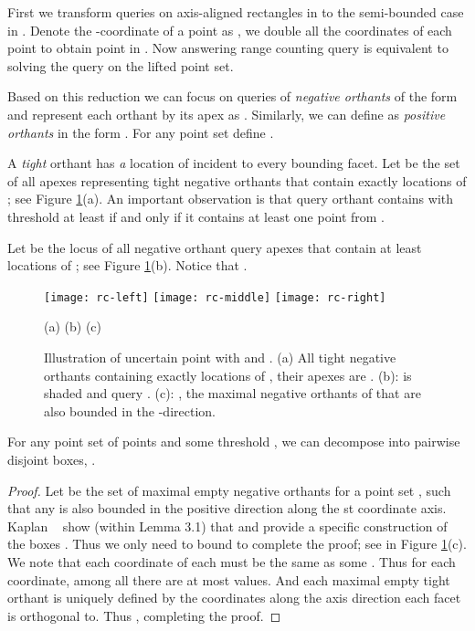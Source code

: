 \documentclass[11pt]{myclass}
\begin{document}
First we transform queries on axis-aligned rectangles in  to the semi-bounded case in .  Denote the -coordinate of a point  as , we double all the coordinates of each point  to obtain point  in . 
Now answering range counting query  is equivalent to solving the query  
on the lifted point set.

Based on this reduction we can focus on queries of \emph{negative orthants} of the form  and represent each orthant by its apex  as .  Similarly, we can define  as \emph{positive orthants} in the form . For any point set  define .

A \emph{tight} orthant has \emph{a} location of  incident to every bounding facet.    
Let  be the set of all apexes representing tight negative orthants that contain exactly  locations of ; see Figure \ref{fig:rc123}(a).   An important observation is that query orthant  contains  with threshold at least  if and only if it contains at least one point from .
 
Let  be the locus of all negative orthant query apexes that contain at least  locations of ; see Figure \ref{fig:rc123}(b).  
Notice that .
 
\begin{figure}[t]
\centering
\texttt{[image: rc-left]}
\hspace{2mm}
\texttt{[image: rc-middle]}
\hspace{2mm}
\texttt{[image: rc-right]}

\vspace{-1mm}
(a)  \hspace{1.85in} (b) \hspace{1.85in} (c)

\vspace{-3mm}
\caption{\small Illustration of uncertain point  with  and . 
(a) All tight negative orthants containing exactly  locations of , their apexes are . 
(b):  is shaded and query .
(c): , the maximal negative orthants of  that are also bounded in the -direction.  
\vspace{-4mm}}

\label{fig:rc123}
\end{figure}


\begin{lemma}
For any point set  of  points and some threshold , we can decompose  into  pairwise disjoint boxes, .
\end{lemma}
 
\begin{proof}
Let  be the set of maximal empty negative orthants for a point set , such that any  is also bounded in the positive direction 
along the st coordinate axis.  
Kaplan \etal~\cite{colors} show (within Lemma 3.1) that  and provide a specific construction of the boxes .  Thus we only need to bound  to complete the proof; see  in Figure \ref{fig:rc123}(c).  
We note that each coordinate of each  must be the same as some .  Thus for each coordinate, among all  there are at most  values.  And each maximal empty tight orthant  is uniquely defined by the  coordinates along the axis direction each facet is orthogonal to.  Thus , completing the proof.  
\end{proof}
 
\end{document}
